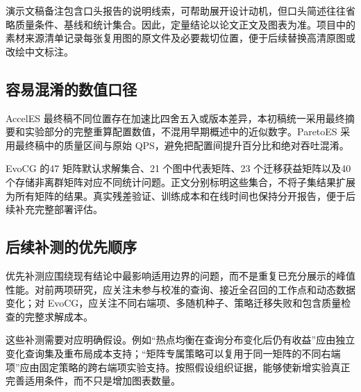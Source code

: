 演示文稿备注包含口头报告的说明线索，可帮助展开设计动机，但口头简述往往省略质量条件、基线和统计集合。因此，定量结论以论文正文及图表为准。项目中的素材来源清单记录每张复用图的原文件及必要裁切位置，便于后续替换高清原图或改绘中文标注。

\subsection{容易混淆的数值口径}
AccelES 最终稿不同位置存在加速比四舍五入或版本差异，本初稿统一采用最终摘要和实验部分的完整重算配置数值，不混用早期概述中的近似数字。ParetoES 采用最终稿中的质量区间与原始 QPS，避免把配置间提升百分比和绝对吞吐混淆。

EvoCG 的47 矩阵默认求解集合、21 个图中代表矩阵、23 个迁移获益矩阵以及40 个存储非离群矩阵对应不同统计问题。正文分别标明这些集合，不将子集结果扩展为所有矩阵的结果。真实残差验证、训练成本和在线时间也保持分开报告，便于后续补充完整部署评估。

\subsection{后续补测的优先顺序}
优先补测应围绕现有结论中最影响适用边界的问题，而不是重复已充分展示的峰值性能。对前两项研究，应关注未参与校准的查询、接近全召回的工作点和动态数据变化；对 EvoCG，应关注不同右端项、多随机种子、策略迁移失败和包含质量检查的完整求解成本。

这些补测需要对应明确假设。例如“热点均衡在查询分布变化后仍有收益”应由独立变化查询集及重布局成本支持；“矩阵专属策略可以复用于同一矩阵的不同右端项”应由固定策略的跨右端项实验支持。按照假设组织证据，能够使新增实验真正完善适用条件，而不只是增加图表数量。
